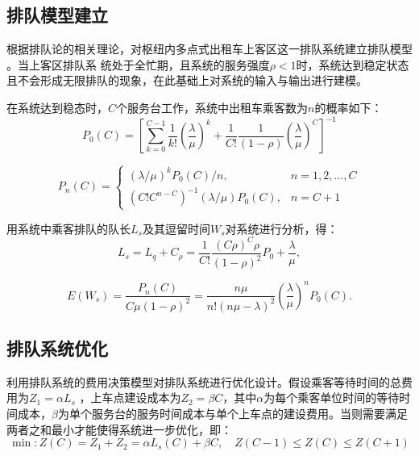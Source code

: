 \subsection{排队模型建立}
根据排队论的相关理论，对枢纽内多点式出租车上客区这一排队系统建立排队模型 。当上客区排队系 统处于全忙期，且系统的服务强度$ρ< 1$时，系统达到稳定状态且不会形成无限排队的现象，在此基础上对系统的输入与输出进行建模。

在系统达到稳态时，$C$个服务台工作，系统中出租车乘客数为$n$的概率如下：
\begin{equation}\label{eq:排队系统出租车乘客数0}
    P_0(C) = \left[\sum_{k=0}^{C-1}\frac{1}{k!}\left(\frac{\lambda}{\mu}\right)^k+ \frac{1}{C!}\frac{1}{(1-\rho)}\left(\frac{\lambda}{\mu}\right)^C\right]^{-1}
\end{equation}

\begin{equation}\label{eq:排队系统出租车乘客数n}
    P_n(C) = \begin{cases}
        \left(\lambda/\mu\right)^kP_0(C)/n, & n=1, 2, \ldots, C \\
        \left(C!C^{n-C}\right)^{-1}\left(\lambda/\mu\right)P_0(C), & n=C+1
    \end{cases}
\end{equation}

用系统中乘客排队的队长$L_s$及其逗留时间$W_s$对系统进行分析，得：
\begin{equation}\label{eq:排队系统乘客队长-2}
    L_s = L_q + C_\rho = \frac{1}{C!}\frac{(C\rho)^C\rho}{(1-\rho)^2}P_0 + \frac{\lambda}{\mu},
\end{equation}

\begin{equation}\label{eq:排队系统逗留时间}
    E(W_s) = \frac{P_n(C)}{C\mu(1-\rho)^2} = \frac{n\mu}{n!(n\mu-\lambda)^2}\left(\frac{\lambda}{\mu}\right)^nP_0(C).
\end{equation}


\subsection{排队系统优化}
利用排队系统的费用决策模型对排队系统进行优化设计。假设乘客等待时间的总费用为$Z_1=\alpha L_s$ ，上车点建设成本为$Z_2=\beta C$，其中$\alpha$为每个乘客单位时间的等待时间成本，$\beta$为单个服务台的服务时间成本与单个上车点的建设费用。当则需要满足两者之和最小才能使得系统进一步优化，即：
\begin{equation}\label{eq:最小化成本}
    \min:Z(C) = Z_1 + Z_2 = \alpha L_s(C) + \beta C, \quad Z(C-1)\leq Z(C)\leq Z(C+1)
\end{equation}